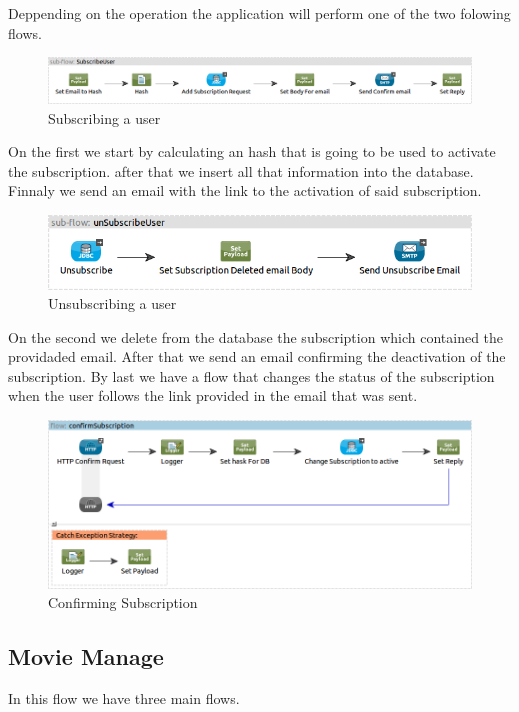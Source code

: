 \documentclass[12pt]{article}
\begin{document}
Deppending on the operation the application will perform one of the two folowing flows.

\begin{figure}[h!]
	\centering
	\includegraphics[width=\textwidth]{SubscribeUser.png}
	\caption{Subscribing a user}
\end{figure}

On the first we start by calculating an hash that is going to be used to activate the subscription. after that we insert all that information into the database. Finnaly we send an email with the link to the activation of said subscription.

\begin{figure}[h!]
	\centering
	\includegraphics[width=\textwidth]{unSubscribeUser.png}
	\caption{Unsubscribing a user}
\end{figure}

On the second we delete from the database the subscription which contained the providaded email. After that we send an email confirming the deactivation of the subscription.
\clearpage
By last we have a flow that changes the status of the subscription when the user follows the link provided in the email that was sent.

\begin{figure}[h!]
	\centering
	\includegraphics[width=\textwidth]{confirmSubscription.png}
	\caption{Confirming Subscription}
\end{figure}
\clearpage

\subsection{Movie Manage}
\indent \indent In this flow we have three main flows.
\end{document}
